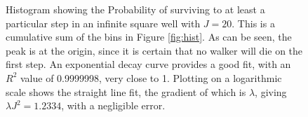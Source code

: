 \documentclass[journal]{IEEEtran}
\begin{document}
\begin{figure}[ht!]
  \centering
  \centering
  \caption{Histogram showing the Probability of surviving to at least a
      particular step in an infinite square well with $J = 20$. This is a
      cumulative sum of the bins in Figure \ref{fig:hist}. As can be seen, the
      peak is at the origin, since it is certain that no walker will die on the
      first step. An exponential decay curve provides a good fit, with an $R^2$
      value of 0.9999998, very close to 1. Plotting on a logarithmic scale shows
      the straight line fit, the gradient of which is $\lambda$, giving $\lambda
      J^2 = 1.2334$, with a negligible error.}
  \label{fig:cumplots}
\end{figure}
\end{document}

